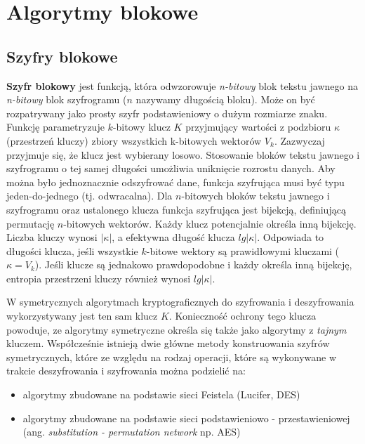 \chapter{Algorytmy blokowe}

\section{Szyfry blokowe}
\textbf{Szyfr blokowy} jest funkcją, która odwzorowuje \textit{n-bitowy} blok tekstu jawnego na \textit{n-bitowy} blok szyfrogramu ($n$ nazywamy długością bloku). Może on być rozpatrywany jako prosty szyfr podstawieniowy o dużym rozmiarze znaku. Funkcję parametryzuje $k$-bitowy klucz $K$ przyjmujący wartości z podzbioru $\kappa$ (przestrzeń kluczy) zbiory wszystkich k-bitowych wektorów $V_k$. Zazwyczaj przyjmuje się, że klucz jest wybierany losowo. Stosowanie bloków tekstu jawnego i szyfrogramu o tej samej długości umożliwia uniknięcie rozrostu danych. Aby można było jednoznacznie odszyfrować dane, funkcja szyfrująca musi być typu jeden-do-jednego (tj. odwracalna). Dla $n$-bitowych bloków tekstu jawnego i szyfrogramu oraz ustalonego klucza funkcja szyfrująca jest bijekcją, definiującą permutację $n$-bitowych wektorów. Każdy klucz potencjalnie określa inną bijekcję. Liczba kluczy wynosi $|\kappa|$, a efektywna długość klucza $lg|\kappa|$. Odpowiada to długości klucza, jeśli wszystkie $k$-bitowe wektory są prawidłowymi kluczami ($\kappa=V_k$). Jeśli klucze są jednakowo prawdopodobne i każdy określa inną bijekcję, entropia przestrzeni kluczy również wynosi $lg|\kappa|$.

W symetrycznych algorytmach kryptograficznych do szyfrowania i deszyfrowania wykorzystywany jest ten sam klucz $K$. Konieczność ochrony tego klucza powoduje, ze algorytmy symetryczne określa się także jako algorytmy z \textit{tajnym} kluczem. Współcześnie istnieją dwie główne metody konstruowania szyfrów symetrycznych, które ze względu na rodzaj operacji, które są wykonywane w trakcie deszyfrowania i szyfrowania można podzielić na:
\begin{itemize}
\item algorytmy zbudowane na podstawie sieci Feistela (Lucifer, DES)
\item algorytmy zbudowane na podstawie sieci podstawieniowo - przestawieniowej (ang. \textit{substitution - permutation network} np. AES)
\end{itemize}

